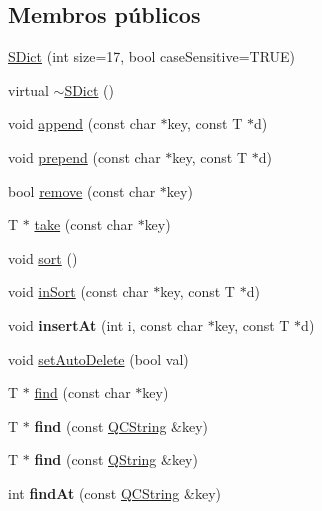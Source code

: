 \subsection*{Membros públicos}
\begin{DoxyCompactItemize}
\item 
\hyperlink{class_s_dict_aa482735a792b031b5c600a12ad28ea3e}{S\-Dict} (int size=17, bool case\-Sensitive=T\-R\-U\-E)
\item 
virtual \hyperlink{class_s_dict_a7ddf49ce6e969c43cfc1084209195bf1}{$\sim$\-S\-Dict} ()
\item 
void \hyperlink{class_s_dict_ad79c653d85ce4c48c0d444763b93245a}{append} (const char $\ast$key, const T $\ast$d)
\item 
void \hyperlink{class_s_dict_a1433eac60c325afaaa781d0e10b51442}{prepend} (const char $\ast$key, const T $\ast$d)
\item 
bool \hyperlink{class_s_dict_a275caa20d5969576fb2decb17dd6a587}{remove} (const char $\ast$key)
\item 
T $\ast$ \hyperlink{class_s_dict_a214af90e3134aab1a8f1d2ebcc58285a}{take} (const char $\ast$key)
\item 
void \hyperlink{class_s_dict_a47fdc9eea42b6975cdc835bb2e08810e}{sort} ()
\item 
void \hyperlink{class_s_dict_a04fd7ec8f0d222ef65b3bec5e9c1bc7a}{in\-Sort} (const char $\ast$key, const T $\ast$d)
\item 
\hypertarget{class_s_dict_aae6033aa444f9f904ee216d3ef24f391}{void {\bfseries insert\-At} (int i, const char $\ast$key, const T $\ast$d)}\label{class_s_dict_aae6033aa444f9f904ee216d3ef24f391}

\item 
void \hyperlink{class_s_dict_ab34e68145e7f3a4fc5714c2df25d6718}{set\-Auto\-Delete} (bool val)
\item 
T $\ast$ \hyperlink{class_s_dict_aa44ecbe8813efa92cac5eb544bd41ac4}{find} (const char $\ast$key)
\item 
\hypertarget{class_s_dict_a0a13be86a53ba2f7f47865915f700c3a}{T $\ast$ {\bfseries find} (const \hyperlink{class_q_c_string}{Q\-C\-String} \&key)}\label{class_s_dict_a0a13be86a53ba2f7f47865915f700c3a}

\item 
\hypertarget{class_s_dict_a4fc2268c10024ebb6ed1b0ea74d97e37}{T $\ast$ {\bfseries find} (const \hyperlink{class_q_string}{Q\-String} \&key)}\label{class_s_dict_a4fc2268c10024ebb6ed1b0ea74d97e37}

\item 
\hypertarget{class_s_dict_a06bc514a30a0b48a0887aea4ed85e128}{int {\bfseries find\-At} (const \hyperlink{class_q_c_string}{Q\-C\-String} \&key)}\label{class_s_dict_a06bc514a30a0b48a0887aea4ed85e128}


\end{DoxyCompactItemize}
